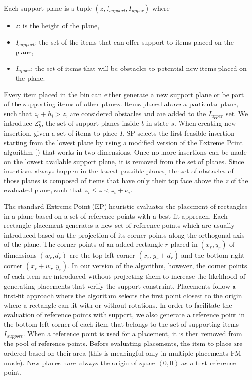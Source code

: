 Each support plane is a tuple $(z, I_{support}, I_{upper})$ where
\begin{itemize}
    \item $z$: is the height of the plane,
    \item $I_{support}$: the set of the items that can offer support to items placed on the plane,
    \item $I_{upper}$: the set of items that will be obstacles to potential new items placed on the plane.
\end{itemize}

Every item placed in the bin can either generate a new support plane or be part of the supporting items of other planes.
Items placed above a particular plane, such that $z_i + h_i > z$, are considered obstacles and are added to the $I_{upper}$ set.
We introduce $Z^s_b$, the set of support planes inside $b$ in state $s$.
When creating new insertion, given a set of items to place $I$, SP selects the first feasible insertion starting from the lowest plane by using a modified version of the Extreme Point algorithm (\cite{crainic2008extreme}) that works in two dimensions.
Once no more insertions can be made on the lowest available support plane, it is removed from the set of planes.
Since insertions always happen in the lowest possible planes, the set of obstacles of those planes is composed of items that have only their top face above the $z$ of the evaluated plane, such that $z_i \le z < z_i + h_i$.

The standard Extreme Point (EP) heuristic evaluates the placement of rectangles in a plane based on a set of reference points with a best-fit approach.
Each rectangle placement generates a new set of reference points which are usually introduced based on the projection of its corner points along the orthogonal axis of the plane.
The corner points of an added rectangle $r$ placed in $(x_r, y_r)$ of dimensions $(w_r, d_r)$ are the top left corner $(x_r, y_r + d_r)$ and the bottom right corner $(x_r + w_r, y_r)$.
In our version of the algorithm, however, the corner points of each item are introduced without projecting them to increase the likelihood of generating placements that verify the support constraint.
Placements follow a first-fit approach where the algorithm selects the first point closest to the origin where a rectangle can fit with or without rotations.
In order to facilitate the evaluation of reference points with support, we also generate a reference point in the bottom left corner of each item that belongs to the set of supporting items $I_{support}$.
When a reference point is used for a placement, it is then removed from the pool of reference points.
Before evaluating placements, the item to place are ordered based on their area (this is meaningful only in multiple placements PM mode).
New planes have always the origin of space $(0,0)$ as a first reference point.

